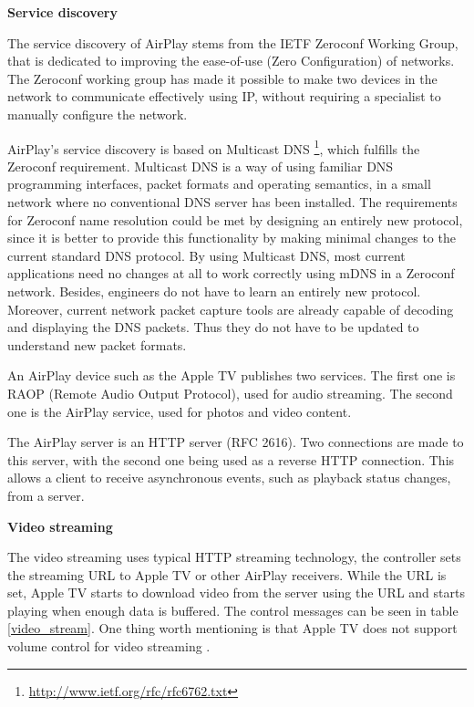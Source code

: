 \textbf{Service discovery}

The service discovery of AirPlay stems from the IETF Zeroconf Working Group, 
that is dedicated to improving the ease-of-use (Zero Configuration) of networks.
The Zeroconf working group has made it possible to make two devices in the 
network to communicate effectively using IP, without requiring a specialist to manually 
configure the network.

AirPlay's service discovery is based on Multicast DNS \cite{multicastdns}
\footnote{\url{http://www.ietf.org/rfc/rfc6762.txt}}, which fulfills the
Zeroconf requirement. Multicast DNS is a way of using familiar DNS programming interfaces, packet formats and operating semantics, in a small 
network where no conventional DNS server has been installed. The requirements 
for Zeroconf name resolution could be met by designing an entirely new 
protocol, since it is better to provide this functionality by making minimal changes 
to the current standard DNS protocol. By using Multicast DNS, most current 
applications need no changes at all to work correctly using mDNS in a Zeroconf network. Besides,
engineers do not have to learn an entirely new protocol. Moreover, current network 
packet capture tools are already capable of  decoding and displaying the DNS packets. Thus they do not 
have to be updated to understand new packet formats.

An AirPlay device such as the Apple TV publishes two services. The first one is 
RAOP (Remote Audio Output Protocol), used for audio streaming. The second 
one is the AirPlay service, used for photos and video content.

The AirPlay server is an HTTP server (RFC 2616). Two connections are made to this 
server, with the second one being used as a reverse HTTP connection. This allows a 
client to receive asynchronous events, such as playback status changes, from a 
server.

\textbf{Video streaming}

The video streaming uses typical HTTP streaming technology, the controller sets 
the streaming URL to Apple TV or other AirPlay receivers. While the URL is set, 
Apple TV starts to download video from the server using the URL and starts 
playing when enough data is buffered. The control messages can be seen in 
table \ref{video_stream}. One thing worth mentioning is that Apple TV does
not support volume control for video streaming \cite{AirPlay-spec}.

